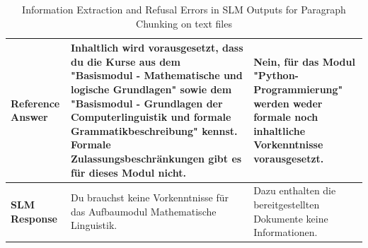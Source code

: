 \documentclass[12pt]{article} %
\begin{document}
\begin{table}[htbp]
\begin{tabularx}{\textwidth}{l X X}
        \midrule
        \textbf{Reference Answer}                                                                                                                                                                                                                                                                                      &
        Inhaltlich wird vorausgesetzt, dass du die Kurse aus dem "Basismodul - Mathematische und logische Grundlagen" sowie dem "Basismodul - Grundlagen der Computerlinguistik und formale Grammatikbeschreibung" kennst. Formale Zulassungsbeschr\"ankungen gibt es f\"ur dieses Modul nicht.                        &
        Nein, f\"ur das Modul "Python-Programmierung" werden weder formale noch inhaltliche Vorkenntnisse vorausgesetzt.                                                                                                                                                                                                                                                                                                                   \\
        \midrule
        \textbf{SLM Response}                                                                                                                                                                                                                                                                                          &
        Du brauchst keine Vorkenntnisse f\"ur das Aufbaumodul Mathematische Linguistik.                                                                                                                                                                                                                                &
        Dazu enthalten die bereitgestellten Dokumente keine Informationen.                                                                                                                                                                                                                                                                                                                                                                 \\
        \bottomrule
    \end{tabularx}
    \caption{Information Extraction and Refusal Errors in SLM Outputs for Paragraph Chunking on text files}
    \label{tab:slm_evaluation_comparison_paragraph_text}
\end{table}
\end{document}
